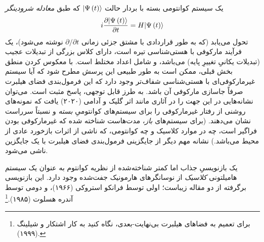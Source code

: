 \documentclass{article}
\begin{document}
یک سیستم کوانتومی بسته با بردار حالت $\vert\Psi\left(t\right)\rangle$ که طبق \emph{معادله شرودینگر}
\begin{equation}
i\frac{\partial\vert\Psi\left(t\right)\rangle}{\partial t}=H\vert\Psi\left(t\right)\rangle\label{eq:SchroEq}
\end{equation}
 تحول می‌یابد (که به طور قراردادی با مشتق جزئی زمانی $\partial/\partial t$ نوشته می‌شود)، یک فرآیند مارکوفی با هستی‌شناسی تیره است، دارای کلاس بزرگی از تبدیلات عجیب (تبدیلات یکانیِ تغییرِ پایه) می‌باشد، و شامل اعداد مختلط است. با معکوس کردن منطق بخش قبلی، ممکن است به طور طبیعی این پرسش مطرح شود که آیا سیستم غیرمارکوفی‌ای با هستی‌شناسی شفاف‌تر وجود دارد که این فرمول‌بندی فضای هیلبرت صرفاً جاسازی مارکوفی آن باشد. به طرز قابل توجهی، پاسخ مثبت است. می‌توان نشانه‌هایی در این جهت را در آثاری مانند اثر گلیک و آدامی (۲۰۲۰)\nocite{GlickAdami:2020manmqm} یافت که نمونه‌های روشنی از رفتار غیرمارکوفی را برای سیستم‌های کوانتومیِ \emph{بسته} و نسبتاً سرراست نشان می‌دهند. (برای سیستم‌های \emph{باز}، مدت‌هاست شناخته شده که غیرمارکوفی بودن فراگیر است، چه در موارد کلاسیک و چه کوانتومی، که ناشی از اثرات بازخورد عادی از محیط می‌باشد.) نشانه مهم دیگر از جایگزینی فرمول‌بندی فضای هیلبرت با یک جایگزین ناشی می‌شود.

یک بازنویسیِ جذاب اما کمتر شناخته‌شده از نظریه کوانتوم به عنوان یک سیستم هامیلتونی \emph{کلاسیک} از نوسانگرهای هارمونیک جفت‌شده وجود دارد. این بازنویسی برگرفته از دو مقاله زیباست؛ اولی توسط فرانکو استروکی (۱۹۶۶)\nocite{Strocchi:1966ccqm}، و دومی توسط آندره هسلوت (۱۹۸۵)\nocite{Heslot:1985qmaact}.\footnote{برای تعمیم به فضاهای هیلبرت بی‌نهایت-بعدی، نگاه کنید به کار اشتکار و شیلینگ (۱۹۹۹)\nocite{AshtekarSchilling:1999gfoqm}.}
\end{document}
